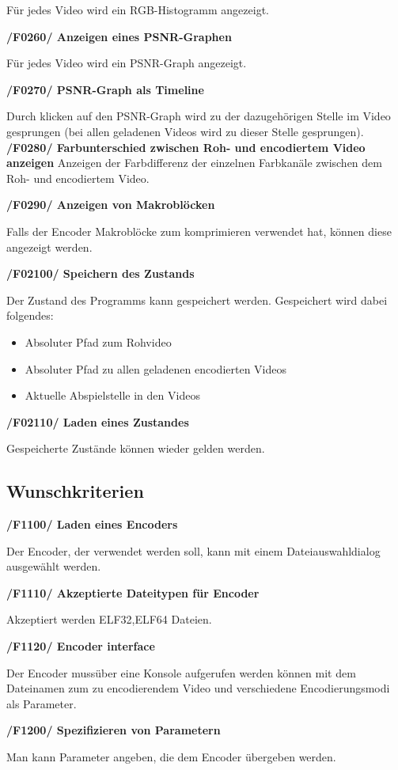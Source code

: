 \documentclass[parskip=full]{scrartcl}
\begin{document}
Für jedes Video wird ein RGB-Histogramm angezeigt.

\textbf{/F0260/ Anzeigen eines PSNR-Graphen}

Für jedes Video wird ein PSNR-Graph angezeigt.

\textbf{/F0270/ PSNR-Graph als Timeline}

Durch klicken auf den PSNR-Graph wird zu der dazugehörigen Stelle im Video gesprungen (bei allen geladenen Videos wird zu dieser Stelle gesprungen).
\textbf{/F0280/ Farbunterschied zwischen Roh- und encodiertem Video anzeigen}
Anzeigen der Farbdifferenz der einzelnen Farbkanäle zwischen dem Roh- und encodiertem Video.

\textbf{/F0290/ Anzeigen von Makroblöcken}

Falls der Encoder Makroblöcke zum komprimieren verwendet hat, können diese angezeigt werden.

\textbf{/F02100/ Speichern des Zustands}

Der Zustand des Programms  kann gespeichert werden. Gespeichert wird dabei folgendes:
\begin{itemize}
\item Absoluter Pfad zum Rohvideo
\item Absoluter Pfad zu allen geladenen encodierten Videos
\item Aktuelle Abspielstelle in den Videos
\end{itemize}

\textbf{/F02110/ Laden eines Zustandes}

Gespeicherte Zustände können wieder gelden werden.
\subsection{Wunschkriterien}
\textbf{/F1100/ Laden eines Encoders}

Der Encoder, der verwendet werden soll, kann mit einem Dateiauswahldialog ausgewählt werden.

\textbf{/F1110/ Akzeptierte Dateitypen für Encoder}

Akzeptiert werden ELF32,ELF64 Dateien.

\textbf{/F1120/ Encoder interface}

Der Encoder mussüber eine Konsole aufgerufen werden können mit dem Dateinamen zum zu encodierendem Video und verschiedene Encodierungsmodi als Parameter.

\textbf{/F1200/ Spezifizieren von Parametern}

Man kann Parameter angeben, die dem Encoder übergeben werden.
\end{document}
